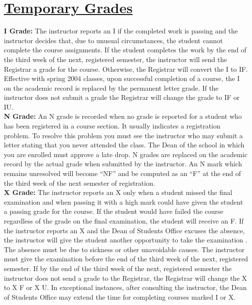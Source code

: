 \documentclass[11pt]{article}
\begin{document}
\section*{\underline{Temporary Grades}}
{\bf\noindent I Grade:} The instructor reports an I if the completed work is passing and the instructor decides that, due to unusual circumstances, the student cannot complete the course assignments. If the student completes the work by the end of the third week of the next, registered semester, the instructor will send the Registrar a grade for the course. Otherwise, the Registrar will convert the I to IF. Effective with spring 2004 classes, upon successful completion of a course, the I on the academic record is replaced by the permanent letter grade. If the instructor does not submit a grade the Registrar will change the grade to IF or IU.\\

{\bf\noindent N Grade:} An N grade is recorded when no grade is reported for a student who has been registered in a course section. It usually indicates a registration problem. To resolve this problem you must see the instructor who may submit a letter stating that you never attended the class. The Dean of the school in which you are enrolled must approve a late drop. N grades are replaced on the academic record by the actual grade when submitted by the instructor. An N mark which remains unresolved will become “NF” and be computed as an “F” at the end of the third week of the next semester of registration.\\

{\bf\noindent X Grade:} The instructor reports an X only when a student missed the final examination and when passing it with a high mark could have given the student a passing grade for the course. If the student would have failed the course regardless of the grade on the final examination, the student will receive an F. If the instructor reports an X and the Dean of Students Office excuses the absence, the instructor will give the student another opportunity to take the examination . The absence must be due to sickness or other unavoidable causes. The instructor must give the examination before the end of the third week of the next, registered semester. If by the end of the third week of the next, registered semester the instructor does not send a grade to the Registrar, the Registrar will change the X to X F or X U. In exceptional instances, after consulting the instructor, the Dean of Students Office may extend the time for completing courses marked I or X.
\end{document}
